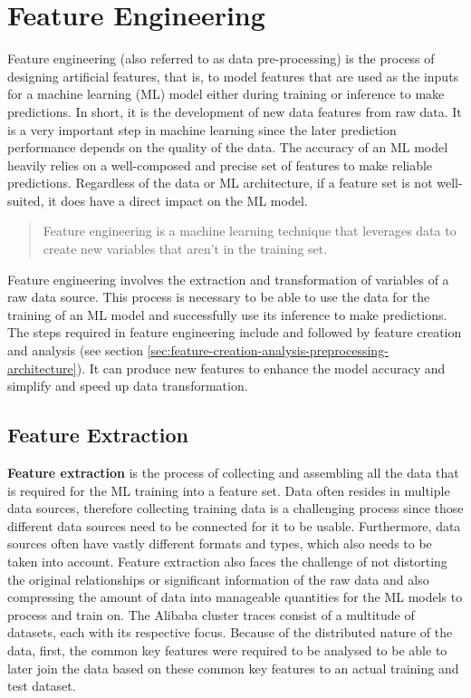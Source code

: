\section{Feature Engineering}
\label{sec:feature-engineering-data-preprocessing-architecture}

  Feature engineering (also referred to as data pre-processing) is the process of designing artificial features, that is, to model features that are used as the inputs for a machine learning (ML) model either during training or inference to make predictions. In short, it is the development of new data features from raw data.
  It is a very important step in machine learning since the later prediction performance depends on the quality of the data.
  The accuracy of an ML model heavily relies on a well-composed and precise set of features to make reliable predictions. Regardless of the data or ML architecture, if a feature set is not well-suited, it does have a direct impact on the ML model.
  \begin{quote}
    Feature engineering is a machine learning technique that leverages data to create new variables that aren't in the training set. \cite{patelWhatFeatureEngineering2021}
  \end{quote}
  Feature engineering involves the extraction and transformation of variables of a raw data source. This process is necessary to be able to use the data for the training of an ML model and successfully use its inference to make predictions.
  The steps required in feature engineering include  and  followed by feature creation and analysis (see section \ref{sec:feature-creation-analysis-preprocessing-architecture}).
  It can produce new features to enhance the model accuracy and simplify and speed up data transformation.

  \subsection{Feature Extraction}
  \label{sec:feature-extraction-preprocessing-architecture}

    \textbf{Feature extraction} is the process of collecting and assembling all the data that is required for the ML training into a feature set.
    Data often resides in multiple data sources, therefore collecting training data is a challenging process since those different data sources need to be connected for it to be usable. Furthermore, data sources often have vastly different formats and types, which also needs to be taken into account. 
    Feature extraction also faces the challenge of not distorting the original relationships or significant information of the raw data and also compressing the amount of data into manageable quantities for the ML models to process and train on.
    The Alibaba cluster traces consist of a multitude of datasets, each with its respective focus. Because of the distributed nature of the data, first, the common key features were required to be analysed to be able to later join the data based on these common key features to an actual training and test dataset.

